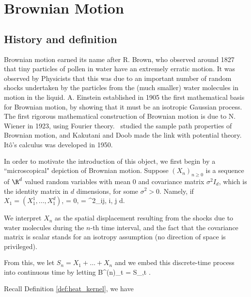 \chapter{Brownian Motion}

\section{History and definition}


Brownian motion earned its name after R. Brown, who observed around 1827 that tiny particles of pollen in water have an extremely erratic motion. It was observed by Physicists that this was due to an important number of random shocks undertaken by the particles from the (much smaller) water molecules in motion in the liquid. A. Einstein established in 1905 the first mathematical basis for Brownian motion, by showing that it must be an isotropic Gaussian process. The first rigorous mathematical construction of Brownian motion is due to N. Wiener in 1923, using Fourier theory. \levy\ studied the sample path properties of Brownian motion, and Kakutani and Doob made the link with potential theory. It\^o's calculus was developed in 1950.


In order to motivate the introduction of this object, we first begin by a ``microscopical" depiction of Brownian motion. Suppose $(X_n)_{n \geq 0}$ is a sequence of $\R^d$ valued random variables with mean 0 and covariance matrix $\sigma^2I_d$, which is the identity matrix in $d$ dimensions, for some $\sigma^2 > 0$. Namely, if $X_1 = (X_1^1, \dots,X^d_1)$,
\be
\E{} = 0,\quad \E{} = \sigma^2\delta_{ij}, \leq i, j \leq d.
\ee

We interpret $X_n$ as the spatial displacement resulting from the shocks due to water molecules during the $n$-th time interval, and the fact that the covariance matrix is scalar stands for an isotropy assumption (no direction of space is privileged).

From this, we let $S_n = X_1 + \dots + X_n$ and we embed this discrete-time process into continuous time by letting
\be
B^{(n)}_t = S_{},\quad t .
\ee

Recall Definition \ref{def:heat_kernel}, we have

